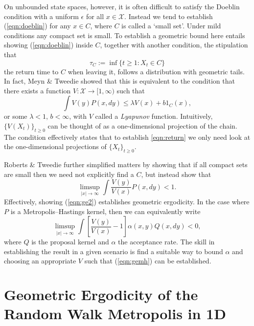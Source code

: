 \documentclass{article}
\newcommand{\ch}[1]{ \{#1_t\}_{t \geq 0} }
\newcommand{\X}{\mathcal{X}}
\begin{document}
On unbounded state spaces, however, it is often difficult to satisfy the Doeblin condition with a uniform $\epsilon$ for all $x \in \X$.  Instead we tend to establish (\ref{eqn:doeblin}) for any $x \in C$, where $C$ is called a `small set'.  Under mild conditions any compact set is small.  To establish a geometric bound here entails showing (\ref{eqn:doeblin}) inside $C$, together with another condition, the stipulation that
\begin{equation} \label{eqn:return}
\tau_C := \inf \{ t \geq 1 : X_t \in C \}
\end{equation}
the return time to $C$ when leaving it, follows a distribution with geometric tails.  In fact, Meyn \& Tweedie showed that this is equivalent to the condition that there exists a function $V: \X \to [1,\infty)$ such that
\begin{equation}
\int V(y)P(x,dy) \leq \lambda V(x) + b1_C(x),
\end{equation}
or some $\lambda<1$, $b < \infty$, with $V$ called a \emph{Lyapunov} function.  Intuitively, $\{ V(X_t) \}_{t \geq 0}$ can be thought of as a one-dimensional projection of the chain.  The condition effectively states that to establish \ref{eqn:return} we only need look at the one-dimensional projections of $\ch{X}$.

Roberts \& Tweedie \cite{} further simplified matters by showing that if all compact sets are small then we need not explicitly find a $C$, but instead show that
\begin{equation} \label{eqn:ge2}
\limsup_{|x| \to \infty} \int \frac{V(y)}{V(x)} P(x,dy) < 1.
\end{equation}
Effectively, showing (\ref{eqn:ge2}) establishes geometric ergodicity.  In the case where $P$ is a Metropolis--Hastings kernel, then we can equivalently write
\begin{equation} \label{eqn:gemh}
\limsup_{|x| \to \infty} \int \left[ \frac{V(y)}{V(x)} - 1 \right] \alpha(x,y)Q(x,dy) < 0,
\end{equation}
where $Q$ is the proposal kernel and $\alpha$ the acceptance rate.  The skill in establishing the result in a given scenario is find a suitable way to bound $\alpha$ and choosing an appropriate $V$ such that (\ref{eqn:gemh}) can be established.

\section{Geometric Ergodicity of the Random Walk Metropolis in 1D}
\end{document}

